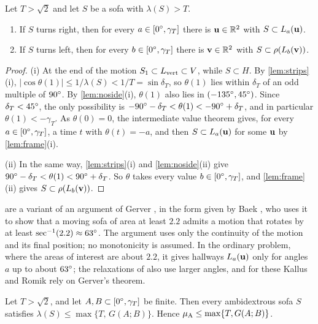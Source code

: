 \begin{prop}\label{prop:natural}
Let $T>\sqrt2$ and let $S$ be a sofa with $\lambda(S)>T$.
\begin{enumerate}[label=(\roman*)]
\item If $S$ turns right, then for every $a\in[0^{\circ},\gamma_T]$ there is $\mathbf{u}\in\mathbb{R}^2$ with $S\subset L_a(\mathbf{u})$.
\item If $S$ turns left, then for every $b\in[0^{\circ},\gamma_T]$ there is $\mathbf{v}\in\mathbb{R}^2$ with $S\subset\rho(L_b(\mathbf{v}))$.
\end{enumerate}
\end{prop}

\begin{proof}
(i) At the end of the motion $S_1\subset L_{\mathrm{vert}}\subset V$, while $S\subset H$. By \cref{lem:strips}(i), $|\cos\theta(1)|\le1/\lambda(S)<1/T=\sin\delta_T$, so $\theta(1)$ lies within $\delta_T$ of an odd multiple of $90^{\circ}$. By \cref{lem:noside}(i), $\theta(1)$ also lies in $(-135^{\circ},45^{\circ})$. Since $\delta_T<45^{\circ}$, the only possibility is $-90^{\circ}-\delta_T<\theta(1)<-90^{\circ}+\delta_T$, and in particular $\theta(1)<-\gamma_T$. As $\theta(0)=0$, the intermediate value theorem gives, for every $a\in[0^{\circ},\gamma_T]$, a time $t$ with $\theta(t)=-a$, and then $S\subset L_a(\mathbf{u})$ for some $\mathbf{u}$ by \cref{lem:frame}(i).

(ii) In the same way, \cref{lem:strips}(i) and \cref{lem:noside}(ii) give $90^{\circ}-\delta_T<\theta(1)<90^{\circ}+\delta_T$. So $\theta$ takes every value $b\in[0^{\circ},\gamma_T]$, and \cref{lem:frame}(ii) gives $S\subset\rho(L_b(\mathbf{v}))$.
\end{proof}

 are a variant of an argument of Gerver \cite[p.~271]{gerver1992}, in the form given by Baek \cite[Theorem~1.5.1]{baek2024}, who uses it to show that a moving sofa of area at least $2.2$ admits a motion that rotates by at least $\sec^{-1}(2.2)\approx63^{\circ}$. The argument uses only the continuity of the motion and its final position; no monotonicity is assumed. In the ordinary problem, where the areas of interest are about $2.2$, it gives hallways $L_a(\mathbf{u})$ only for angles $a$ up to about $63^{\circ}$; the relaxations of \cite{kallusromik2018} also use larger angles, and for these Kallus and Romik rely on Gerver's theorem.

\begin{thm}\label{thm:reduction2}
Let $T>\sqrt2$, and let $A,B\subset[0^{\circ},\gamma_T]$ be finite. Then every ambidextrous sofa $S$ satisfies $\lambda(S)\le\max\{T,\,G(A;B)\}$. Hence $\mu_{\mathrm{A}}\le\max\{T,G(A;B)\}$.
\end{thm}

